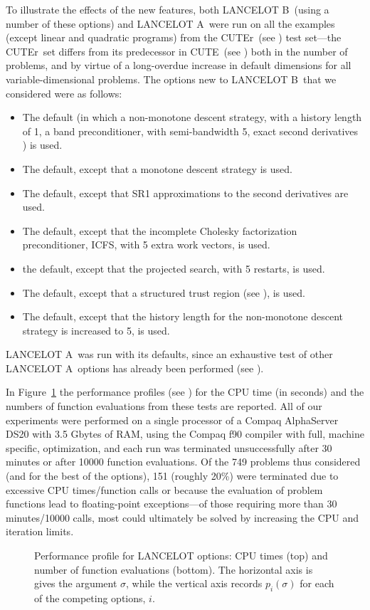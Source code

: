 \documentclass[twoside]{article}
\newcommand{\lana}{{\sf LANCELOT A}}
\newcommand{\lanb}{{\sf LANCELOT B}}
\newcommand{\cute}{{\sf CUTE}}
\newcommand{\cuter}{{\sf CUTEr}}
\begin{document}
To illustrate the effects of the new features,
both \lanb\ (using a number of these options) and \lana\
were run on all the examples (except linear and quadratic programs) from
the \cuter\ (see \bciteb{GoulOrbaToin02b})
test set---the \cuter\ set differs from its predecessor
in \cute\ (see )
both in the number of problems, and by virtue of a long-overdue
increase in default dimensions for all variable-dimensional problems.
The options new to \lanb\ that we considered were as follows:
\begin{itemize}
\item The default (in which a non-monotone descent strategy, with a
history length of 1, a band preconditioner, with semi-bandwidth 5, exact second
derivatives ) is used.
\item The default, except that a monotone descent strategy is used.
\item The default, except that SR1 approximations to the second derivatives
are used.
\item The default, except that the  incomplete Cholesky
   factorization preconditioner, ICFS, with 5 extra work vectors, is used.
\item the default, except that the \citebb{MoreTora91} projected search,
with 5 restarts, is used.
\item The default, except that a structured trust region
   (see ), is used.
\item The default, except that the history length for the
non-monotone descent strategy is increased to 5, is used.
\end{itemize}
\lana\ was run with its defaults, since an exhaustive test
of other \lana\ options has already been performed
(see ).

In Figure~\ref{prof.ps}
the performance profiles (see ) for the CPU time
(in seconds) and the numbers of function evaluations
from these tests are reported. All of our experiments were performed
on a single processor of a Compaq AlphaServer DS20 with 3.5 Gbytes of RAM,
using the Compaq f90 compiler with full, machine specific, optimization,
and each run was terminated unsuccessfully after 30 minutes or after 10000
function evaluations.
Of the 749 problems thus considered (and for the best of the
options), 151 (roughly 20\%)
were terminated due to excessive CPU times/function calls or because
the evaluation of problem functions lead to floating-point exceptions---of
those requiring more than 30 minutes/10000 calls, most could ultimately
be solved by increasing the CPU and iteration limits.
\begin{figure}[htbp]
\centerline{
}\centerline{
            }
\caption{Performance profile for LANCELOT options: CPU times (top)
and number of function evaluations (bottom). The horizontal axis is
gives the argument $\sigma$, while the vertical axis records $p_i(\sigma)$
for each of the competing options, $i$.}
\label{prof.ps}
\end{figure}
\end{document}
